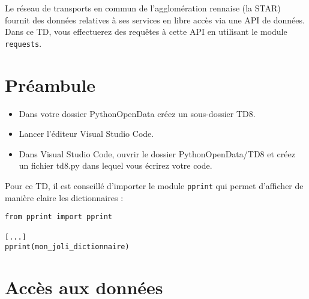 \documentclass[11pt,a4paper]{article}
\begin{document}

Le réseau de transports en commun de l'agglomération rennaise (la STAR) fournit des données relatives à ses services en libre accès via une API de données.
Dans ce TD, vous effectuerez des requêtes à cette API en utilisant le module \verb+requests+.

\section*{Préambule}
\begin{itemize}
    \item Dans votre dossier PythonOpenData créez un sous-dossier TD8.
    \item Lancer l'éditeur Visual Studio Code.
    \item Dans Visual Studio Code, ouvrir le dossier PythonOpenData/TD8 et créez un fichier td8.py dans lequel vous écrirez votre code. 
\end{itemize}

Pour ce TD, il est conseillé d'importer le module \verb+pprint+ qui permet d'afficher de manière claire les dictionnaires :

\begin{verbatim}
from pprint import pprint

[...]
pprint(mon_joli_dictionnaire)
\end{verbatim}

\section{Accès aux données}
\end{document}
